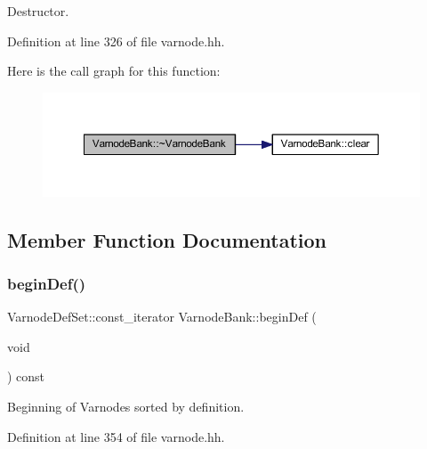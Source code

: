 Destructor. 



Definition at line 326 of file varnode.\+hh.

Here is the call graph for this function\+:
\nopagebreak
\begin{figure}[H]
\begin{center}
\leavevmode
\includegraphics[width=350pt]{class_varnode_bank_afa3b1db96511f8c7481ab67b9e39d36c_cgraph}
\end{center}
\end{figure}


\subsection{Member Function Documentation}
\mbox{\label{class_varnode_bank_a93884ad8b00531125e028acbb910aacc}} 
\subsubsection{\texorpdfstring{beginDef()}{beginDef()}\hspace{0.1cm}{\footnotesize\ttfamily [1/3]}}
{\footnotesize\ttfamily Varnode\+Def\+Set\+::const\+\_\+iterator Varnode\+Bank\+::begin\+Def (\begin{DoxyParamCaption}\item[{void}]{ }\end{DoxyParamCaption}) const\hspace{0.3cm}{\ttfamily [inline]}}



Beginning of Varnodes sorted by definition. 



Definition at line 354 of file varnode.\+hh.


